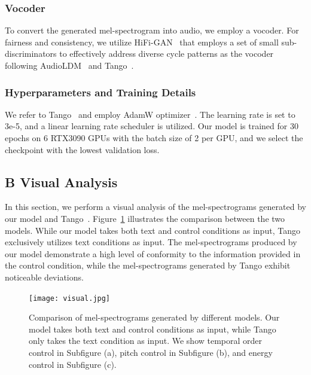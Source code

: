 \documentclass[letterpaper]{article}
\begin{document}
\subsubsection{Vocoder} To convert the generated mel-spectrogram into audio, we employ a vocoder. For fairness and consistency, we utilize HiFi-GAN~\cite{kong2020hifigan} that employs a set of small sub-discriminators to effectively address diverse cycle patterns as the vocoder following AudioLDM~\cite{liu2023audioldm} and Tango~\cite{ghosal2023tango}.

\subsubsection{Hyperparameters and Training Details} We refer to Tango~\cite{ghosal2023tango} and employ AdamW optimizer~\cite{loshchilov2017decoupledwd}. The learning rate is set to 3e-5, and a linear learning rate scheduler is utilized. Our model is trained for 30 epochs on 6 RTX3090 GPUs with the batch size of 2 per GPU, and we select the checkpoint with the lowest validation loss.

\subsection{B Visual Analysis}

In this section, we perform a visual analysis of the mel-spectrograms generated by our model and Tango~\cite{choi2018stargan}. Figure~\ref{visual} illustrates the comparison between the two models. While our model takes both text and control conditions as input, Tango exclusively utilizes text conditions as input. The mel-spectrograms produced by our model demonstrate a high level of conformity to the information provided in the control condition, while the mel-spectrograms generated by Tango exhibit noticeable deviations.

\begin{figure}[!t]
    \centering
    \texttt{[image: visual.jpg]}
    \caption{Comparison of mel-spectrograms generated by different models. Our model takes both text and control conditions as input, while Tango only takes the text condition as input. We show temporal order control in Subfigure (a), pitch control in Subfigure (b), and energy control in Subfigure (c).}
    \label{visual}
\end{figure}
\end{document}
